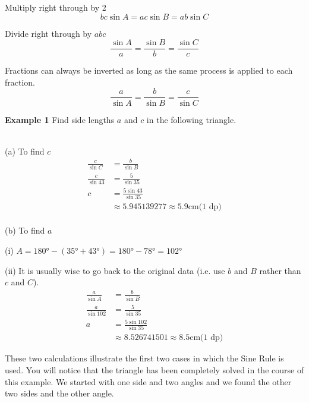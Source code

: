Multiply right through by 2
\begin{equation*}b c \sin  A =a c \sin  B =a b \sin  C
\end{equation*}

Divide right through by $a b c$
\begin{equation*}\frac{\sin  A}{a} =\frac{\sin  B}{b} =\frac{\sin  C}{c}
\end{equation*}

Fractions can always be inverted as long as the same process is applied to each fraction.
\begin{equation*}\frac{a}{\sin  A} =\frac{b}{\sin  B} =\frac{c}{\sin  C}
\end{equation*}

\textbf{Example 1} Find side lengths $a$ and $c$ in the following triangle.

\setlength\fboxrule{0in}\setlength\fboxsep{0.2in}
\\\relax (a) To find $c$
\begin{align*}\frac{c}{\sin  C} &  = \frac{b}{\sin  B} \\
\frac{c}{\sin  43 } &  = \frac{5}{\sin  35 } \\
c &  = \frac{5 \sin  43 }{\sin  35 } \\
&  \approx   5.945139277 \approx 5.9 \mbox{cm}\text{(1 dp)}\end{align*} \\\relax (b) To find $a$ 

(i) $A =\ang{180}  -(\ang{35}  +\ang{43} ) =\ang{180}  -\ang{78}  =\ang{102} $ 

(ii) It is usually wise to go back to the original data (i.e. use $b$ and $B$ rather than $c$ and $C$).
\begin{align*}\frac{a}{\sin  A} &  = \frac{b}{\sin  B} \\
\frac{a}{\sin  102 } &  = \frac{5}{\sin  35 } \\
a &  = \frac{5 \sin  102 }{\sin  35 } \\
&  \approx   8.526741501 \approx 8.5 \mbox{cm}\text{(1 dp)}\end{align*}

These two calculations illustrate the first two cases in which the Sine Rule is used. You will notice that the triangle has been completely solved in the course of this example. We started with one side and two angles and we found the other two sides and the other angle. 

